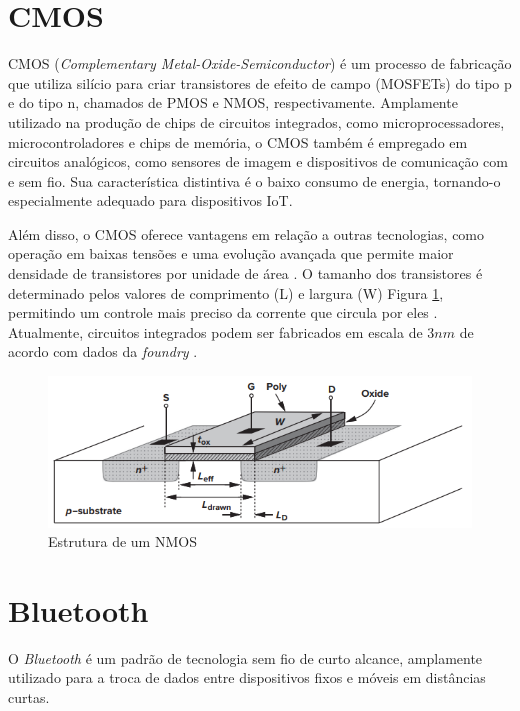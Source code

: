 \section{CMOS}
CMOS (\textit{Complementary Metal-Oxide-Semiconductor}) é um processo de fabricação que utiliza silício para criar transistores de efeito de campo (MOSFETs) do tipo p e do tipo n, chamados de PMOS e NMOS, respectivamente. Amplamente utilizado na produção de chips de circuitos integrados, como microprocessadores, microcontroladores e chips de memória, o CMOS também é empregado em circuitos analógicos, como sensores de imagem e dispositivos de comunicação com e sem fio. Sua característica distintiva é o baixo consumo de energia, tornando-o especialmente adequado para dispositivos IoT.

Além disso, o CMOS oferece vantagens em relação a outras tecnologias, como operação em baixas tensões e uma evolução avançada que permite maior densidade de transistores por unidade de área . O tamanho dos transistores é determinado pelos valores de comprimento (L) e largura (W) Figura \ref{fig:nmos_structure}, permitindo um controle mais preciso da corrente que circula por eles \cite{designcmosrazavi2016}. Atualmente, circuitos integrados podem ser fabricados em escala de $3nm$ de acordo com dados da \textit{foundry} \cite{tsmc}.

\begin{figure}[h!]
	\caption{Estrutura de um NMOS}
	\begin{center}
		\includegraphics[scale=0.6]{img/nmos_structure.png}
	\end{center}
	\label{fig:nmos_structure}
\end{figure}

\section{Bluetooth}
O \textit{Bluetooth} é um padrão de tecnologia sem fio de curto alcance, amplamente utilizado para a troca de dados entre dispositivos fixos e móveis em distâncias curtas. 

